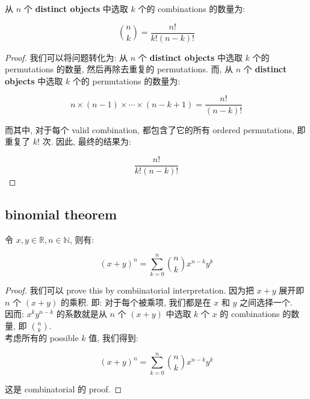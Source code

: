 \begin{proposition}

从 \(\mathit{n}\) 个 \textbf{distinct objects} 中选取 \(\mathit{k}\) 个的 combinations 的数量为:

\[\binom{\mathit{n}}{\mathit{k}} = \frac{\mathit{n}!}{\mathit{k}!(\mathit{n} - \mathit{k})!}\]

\end{proposition}

\begin{proof}

我们可以将问题转化为: 从 \(\mathit{n}\) 个 \textbf{distinct objects} 中选取 \(\mathit{k}\) 个的 permutations 的数量, 然后再除去重复的 permutations. 而, 从 \(\mathit{n}\) 个 \textbf{distinct objects} 中选取 \(\mathit{k}\) 个的 permutations 的数量为:

\[\mathit{n} \times (\mathit{n} - 1) \times \cdots \times (\mathit{n} - \mathit{k} + 1) = \frac{\mathit{n}!}{(\mathit{n} - \mathit{k})!}\]

而其中, 对于每个 valid combination, 都包含了它的所有 ordered permutations, 即重复了 \(\mathit{k}!\) 次. 因此, 最终的结果为:

\[\frac{\mathit{n}!}{\mathit{k}!(\mathit{n} - \mathit{k})!}\]

\end{proof}

\subsection{binomial theorem}\label{binomial-theorem}

\begin{theorem}{}

令 \(\mathit{x},\mathit{y} \in \mathbb{R},\mathit{n} \in \mathbb{N}\), 则有:

\[(\mathit{x} + \mathit{y})^{\mathit{n}} = \sum\limits_{\mathit{k} = 0}^{\mathit{n}}\binom{\mathit{n}}{\mathit{k}}\mathit{x}^{\mathit{n} - \mathit{k}}\mathit{y}^{\mathit{k}}\]

\end{theorem}

\begin{proof}

我们可以 prove this by combiinatorial interpretation. 因为把 \(\mathit{x} + \mathit{y}\) 展开即 \(\mathit{n}\) 个 \((\mathit{x} + \mathit{y})\) 的乘积. 即: 对于每个被乘项, 我们都是在 \(\mathit{x}\) 和 \(\mathit{y}\) 之间选择一个.\\
因而: \(\mathit{x}^{\mathit{k}}\mathit{y}^{\mathit{n} - \mathit{k}}\) 的系数就是从 \(\mathit{n}\) 个 \((\mathit{x} + \mathit{y})\) 中选取 \(\mathit{k}\) 个 \(\mathit{x}\) 的 combinations 的数量, 即 \(\binom{\mathit{n}}{\mathit{k}}\).\\
考虑所有的 possible \(\mathit{k}\) 值, 我们得到:

\[(\mathit{x} + \mathit{y})^{\mathit{n}} = \sum\limits_{\mathit{k} = 0}^{\mathit{n}}\binom{\mathit{n}}{\mathit{k}}\mathit{x}^{\mathit{n} - \mathit{k}}\mathit{y}^{\mathit{k}}\]

这是 combinatorial 的 proof.

\end{proof}

